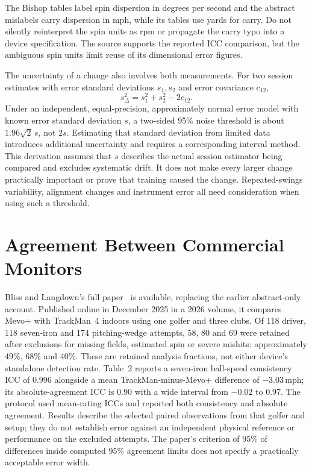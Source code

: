 The Bishop tables label spin dispersion in degrees per second and the abstract mislabels carry dispersion in mph, while its tables use yards for carry.
Do not silently reinterpret the spin units as rpm or propagate the carry typo into a device specification.
The source supports the reported ICC comparison, but the ambiguous spin units limit reuse of its dimensional error figures.

The uncertainty of a change also involves both measurements.
For two session estimates with error standard deviations $s_1,s_2$ and error covariance $c_{12}$,
\begin{equation}
\label{eq:changeuncertainty}
 s_{\Delta}^2=s_1^2+s_2^2-2c_{12}.
\end{equation}
Under an independent, equal-precision, approximately normal error model with known error standard deviation $s$, a two-sided 95\% noise threshold is about $1.96\sqrt{2}\,s$, not $2s$.
Estimating that standard deviation from limited data introduces additional uncertainty and requires a corresponding interval method.
This derivation assumes that $s$ describes the actual session estimator being compared and excludes systematic drift.
It does not make every larger change practically important or prove that training caused the change.
Repeated-swings variability, alignment changes and instrument error all need consideration when using such a threshold.

\section{Agreement Between Commercial Monitors}

Bliss and Langdown's full paper~\cite{mevoplusstudy} is available, replacing the earlier abstract-only account.
Published online in December 2025 in a 2026 volume, it compares Mevo+ with TrackMan~4 indoors using one golfer and three clubs.
Of 118 driver, 118 seven-iron and 174 pitching-wedge attempts, 58, 80 and 69 were retained after exclusions for missing fields, estimated spin or severe mishits: approximately 49\%, 68\% and 40\%.
These are retained analysis fractions, not either device's standalone detection rate.
Table~2 reports a seven-iron ball-speed consistency ICC of 0.996 alongside a mean TrackMan-minus-Mevo+ difference of $-3.03$\,mph; its absolute-agreement ICC is 0.90 with a wide interval from $-0.02$ to 0.97.
The protocol used mean-rating ICCs and reported both consistency and absolute agreement.
Results describe the selected paired observations from that golfer and setup; they do not establish error against an independent physical reference or performance on the excluded attempts.
The paper's criterion of 95\% of differences inside computed 95\% agreement limits does not specify a practically acceptable error width.

